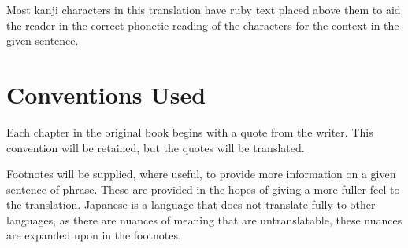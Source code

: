 \par Most kanji characters in this translation have ruby text placed above them to aid the reader in the correct phonetic reading of the characters for the context in the given sentence.

\section*{Conventions Used}
Each chapter in the original book begins with a quote from the writer. This convention will be retained, but the quotes will be translated.
\par Footnotes will be supplied, where useful, to provide more information on a given sentence of phrase. These are provided in the hopes of giving a more fuller feel to the translation. Japanese is a language that does not translate fully to other languages, as there are nuances of meaning that are untranslatable, these nuances are expanded upon in the footnotes.

\theendnotes